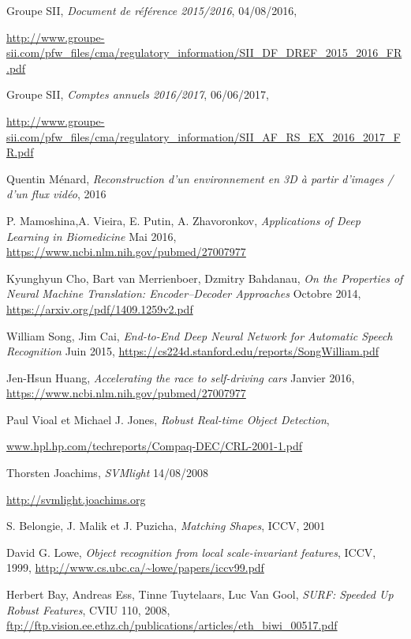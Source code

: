 \begin{thebibliography}{9}

		Groupe SII,
		\emph{Document de référence 2015/2016},
		04/08/2016,
		\par
		\url{http://www.groupe-sii.com/pfw_files/cma/regulatory_information/SII_DF_DREF_2015_2016_FR.pdf}
	
		Groupe SII,
		\emph{Comptes annuels 2016/2017},
		06/06/2017,
		\par
		\url{http://www.groupe-sii.com/pfw_files/cma/regulatory_information/SII_AF_RS_EX_2016_2017_FR.pdf}
	
		Quentin Ménard,
		\emph{Reconstruction d’un environnement en 3D à partir d’images / d’un flux vidéo},
		2016
	
		P. Mamoshina,A. Vieira, E. Putin, A. Zhavoronkov,
		\emph{Applications of Deep Learning in Biomedicine}
		Mai 2016,
		\url{https://www.ncbi.nlm.nih.gov/pubmed/27007977}

		Kyunghyun Cho, Bart van Merrienboer, Dzmitry Bahdanau,
		\emph{On the Properties of Neural Machine Translation: Encoder–Decoder Approaches}
		Octobre 2014,
		\url{https://arxiv.org/pdf/1409.1259v2.pdf}

		William Song, Jim Cai,
		\emph{End-to-End Deep Neural Network for Automatic Speech Recognition}
		Juin 2015,
		\url{https://cs224d.stanford.edu/reports/SongWilliam.pdf}

		Jen-Hsun Huang,
		\emph{Accelerating the race to self-driving cars}
		Janvier 2016,
		\url{https://www.ncbi.nlm.nih.gov/pubmed/27007977}
		
	
		Paul Vioal et Michael J. Jones,
		\emph{Robust Real-time Object Detection},
		\par
		\url{www.hpl.hp.com/techreports/Compaq-DEC/CRL-2001-1.pdf}
	
		Thorsten Joachims,
		\emph{SVMlight}
		14/08/2008
		\par
		\url{http://svmlight.joachims.org}
	
		S. Belongie, J. Malik et J. Puzicha,
		\emph{Matching Shapes},
		ICCV,
		2001

		David G. Lowe,
		\emph{Object recognition from local scale-invariant features},
		ICCV,
		1999,
		\url{http://www.cs.ubc.ca/~lowe/papers/iccv99.pdf}

		Herbert Bay, Andreas Ess, Tinne Tuytelaars, Luc Van Gool,
		\emph{SURF: Speeded Up Robust Features},
		CVIU 110,
		2008,
		\url{ftp://ftp.vision.ee.ethz.ch/publications/articles/eth_biwi_00517.pdf}
	

\end{thebibliography}
